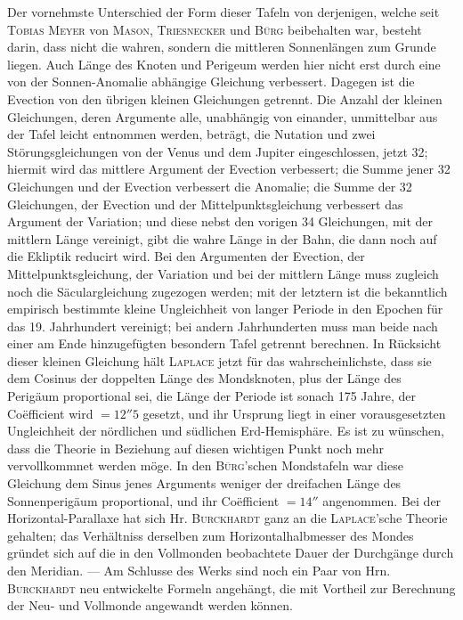 Der vornehmste Unterschied der Form dieser Tafeln von derjenigen, welche seit \textsc{Tobias Meyer} von \textsc{Mason}, \textsc{Triesnecker} und \textsc{Bürg} beibehalten war, besteht darin, dass nicht die wahren, sondern die mittleren Sonnenlängen zum Grunde liegen. Auch Länge des Knoten und Perigeum werden hier nicht erst durch eine von der Sonnen-Anomalie abhängige Gleichung verbessert. Dagegen ist die Evection von den übrigen kleinen Gleichungen getrennt. Die Anzahl der kleinen Gleichungen, deren Argumente alle, unabhängig von einander, unmittelbar aus der Tafel leicht entnommen werden, beträgt, die Nutation und zwei Störungsgleichungen von der Venus und dem Jupiter eingeschlossen, jetzt 32; hiermit wird das mittlere Argument der Evection verbessert; die Summe jener 32 Gleichungen und der Evection verbessert die Anomalie; die Summe der 32 Gleichungen, der Evection und der Mittelpunktsgleichung verbessert das Argument der Variation; und diese nebst den vorigen 34 Gleichungen, mit der mittlern Länge vereinigt, gibt die wahre Länge in der Bahn, die dann noch auf die Ekliptik reducirt wird. Bei den Argumenten der Evection, der Mittelpunktsgleichung, der Variation und bei der mittlern Länge muss zugleich noch die Säculargleichung zugezogen werden; mit der letztern ist die bekanntlich empirisch bestimmte kleine Ungleichheit von langer Periode in den Epochen für das 19. Jahrhundert vereinigt; bei andern Jahrhunderten muss man beide nach einer am Ende hinzugefügten besondern Tafel getrennt berechnen. In Rücksicht dieser kleinen Gleichung hält \textsc{Laplace} jetzt für das wahrscheinlichste, dass sie dem Cosinus der doppelten Länge des Mondsknoten, plus der Länge des Perigäum proportional sei, die Länge der Periode ist sonach 175 Jahre, der Coëfficient wird $= 12''5$ gesetzt, und ihr Ursprung liegt in einer vorausgesetzten Ungleichheit der nördlichen und südlichen Erd-Hemisphäre. Es ist zu wünschen, dass die Theorie in Beziehung auf diesen wichtigen Punkt noch mehr vervollkommnet werden möge. In den \textsc{Bürg}'schen Mondstafeln war diese Gleichung dem Sinus jenes Arguments weniger der dreifachen Länge des Sonnenperigäum proportional, und ihr Coëfficient $= 14''$ angenommen. Bei der Horizontal-Parallaxe hat sich Hr. \textsc{Burckhardt} ganz an die \textsc{Laplace}'sche Theorie gehalten; das Verhältniss derselben zum Horizontalhalbmesser des Mondes gründet sich auf die in den Vollmonden beobachtete Dauer der Durchgänge durch den Meridian. --- Am Schlusse des Werks sind noch ein Paar von Hrn. \textsc{Burckhardt} neu entwickelte Formeln angehängt, die mit Vortheil zur Berechnung der Neu- und Vollmonde angewandt werden können.
